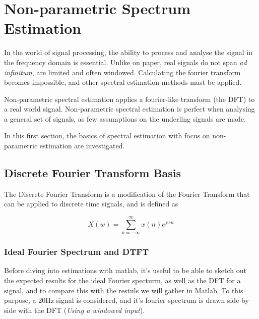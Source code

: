 \documentclass[main.tex]{subfiles}
\begin{document}
\section{Non-parametric Spectrum Estimation}

In the world of signal processing, the ability to process and analyse the signal in the frequency domain is essential. Unlike on paper, real signals do not span \textit{ad infinitum}, are limited and often windowed. Calculating the fourier transform becomes impossible, and other spectral estimation methods must be applied. 

Non-parametric spectral estimation applies a fourier-like transform (the DFT) to a real world signal. Non-parametric spectral estimation is perfect when analysing a general set of signals, as few assumptions on the underling signals are made.

In this first section, the basics of spectral estimation with focus on non-parametric estimation are investigated.


\subsection{Discrete Fourier Transform Basis}

The Discrete Fourier Transform is a modification of the Fourier Transform that can be applied to discrete time signals, and is defined as 

\begin{equation}
X(w) = \sum_{n=-\infty}^{\infty} x(n)e^{jwn}
\end{equation}

\subsubsection{Ideal Fourier Spectrum and DTFT}

Before diving into estimations with matlab, it's useful to be able to sketch out the expected results for the ideal Fourier specturm, as well as the DFT for a signal, and to compare this with the restuls we will gather in Matlab. To this purpose, a 20Hz signal is considered, and it's fourier spectrum is drawn side by side with the DFT (\textit{Using a windowed input}).
\end{document}
